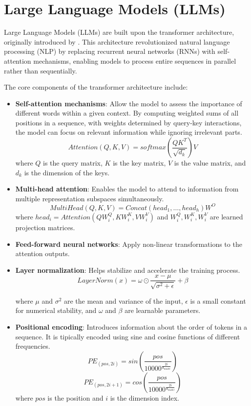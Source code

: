 



\section{Large Language Models (LLMs)}

Large Language Models (LLMs) are built upon the transformer architecture, originally introduced by \cite{vaswani2023attentionneed}. This architecture revolutionized natural language processing (NLP) by replacing recurrent neural networks (RNNs) with self-attention mechanisms, enabling models to process entire sequences in parallel rather than sequentially.

The core components of the transformer architecture include:
\begin{itemize}
    \item \textbf{Self-attention mechanisms}: Allow the model to assess the importance of different words within a given context. By computing weighted sums of all positions in a sequence, with weights determined by query-key interactions, the model can focus on relevant information while ignoring irrelevant parts.
    $$Attention (Q, K, V) = softmax\left(\frac{QK^T}{\sqrt{d_k}}\right)V$$
    where \( Q \) is the query matrix, \( K \) is the key matrix, \( V \) is the value matrix, and \( d_k \) is the dimension of the keys.

    \item \textbf{Multi-head attention}: Enables the model to attend to information from multiple representation subspaces simultaneously.
    $$MultiHead(Q, K, V) = Concat(head_1, \dots, head_h)W^O$$
    where \( head_i = Attention(QW_i^Q, KW_i^K, VW_i^V) \) and \( W_i^Q, W_i^K, W_i^V \) are learned projection matrices.

    \item \textbf{Feed-forward neural networks}: Apply non-linear transformations to the attention outputs.
    \item \textbf{Layer normalization}: Helps stabilize and accelerate the training process.
    $$LayerNorm(x) = \omega \odot  \frac{x - \mu}{\sqrt{\sigma^2 + \epsilon}} + \beta$$

    where \( \mu \) and \( \sigma^2 \) are the mean and variance of the input, \( \epsilon \) is a small constant for numerical stability, and \( \omega \) and \( \beta \) are learnable parameters.
    

    \item \textbf{Positional encoding}: Introduces information about the order of tokens in a sequence. It is tipically encoded using sine and cosine functions of different frequencies.
    $$PE_{(pos, 2i)} = sin\left(\frac{pos}{10000^{\frac{2i}{d_{model}}}}\right)$$  
    $$PE_{(pos, 2i+1)} = cos\left(\frac{pos}{10000^{\frac{2i}{d_{model}}}}\right)$$
    where \( pos \) is the position and \( i \) is the dimension index.

\end{itemize}

